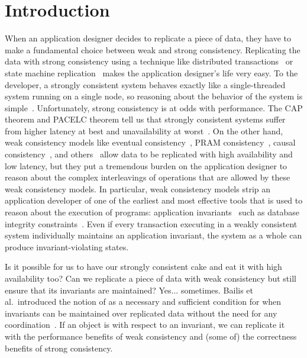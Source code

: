 \section{Introduction}
When an application designer decides to replicate a piece of data, they have to
make a fundamental choice between weak and strong consistency. Replicating the
data with strong consistency using a technique like distributed
transactions~\cite{bernstein1981concurrency} or state
machine replication~\cite{lamport1998part} makes the application designer's life
very easy. To the developer, a strongly consistent system behaves exactly like
a single-threaded system running on a single node, so reasoning about the
behavior of the system is simple~\cite{herlihy1990linearizability}.
Unfortunately, strong consistency is at odds with performance. The CAP theorem
and PACELC theorem tell us that strongly consistent systems suffer from higher
latency at best and unavailability at worst~\cite{gilbert2002brewer,
abadi2012consistency}. On the other hand, weak consistency
models like eventual consistency~\cite{vogels2009eventually}, PRAM
consistency~\cite{lipton1988pram}, causal consistency~\cite{ahamad1995causal},
and others~\cite{lloyd2011don, mehdi2017can} allow data to be replicated with
high availability and low latency, but they put a tremendous burden on the
application designer to reason about the complex interleavings of operations
that are allowed by these weak consistency models. In particular, weak
consistency models strip an application developer of one of the earliest and
most effective tools that is used to reason about the execution of programs:
application invariants~\cite{balegas2015towards} such as
database integrity constraints~\cite{grefen1993integrity}. Even
if every transaction executing in a weakly consistent system individually
maintains an application invariant, the system as a whole can produce
invariant-violating states.

Is it possible for us to have our strongly consistent cake and eat it with high
availability too? Can we replicate a piece of data with weak consistency but
still ensure that its invariants are maintained? Yes... sometimes. Bailis et
al.\ introduced the notion of \emph{\invariantconfluence{}} as a necessary and
sufficient condition for when invariants can be maintained over replicated data
without the need for any coordination~\cite{bailis2014coordination}. If an
object is \invariantconfluent{} with respect to an invariant, we can replicate
it with the performance benefits of weak consistency and (some of) the
correctness benefits of strong consistency.

